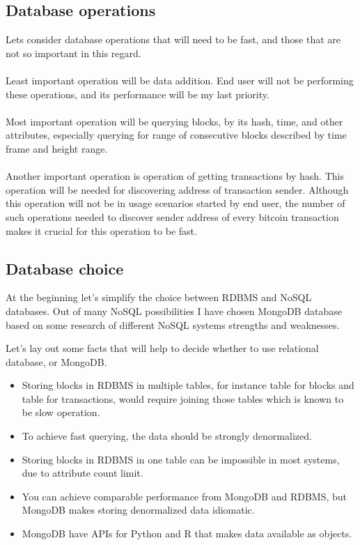 \documentclass[12pt, en, eng, oneside]{mgr}
\begin{document}
\subsection{Database operations}
Lets consider database operations that will need to be fast, and those that are not so important in this regard.
\\
\\
Least important operation will be data addition. End user will not be performing these operations, and its performance will be my last priority.
\\
\\
Most important operation will be querying blocks, by its hash, time, and other attributes, especially querying for range of consecutive blocks described by time frame and height range.
\\
\\
Another important operation is operation of getting transactions by hash. This operation will be needed for discovering address of transaction sender. Although this operation will not be in usage scenarios started by end user, the number of such operations needed to discover sender address of every bitcoin transaction makes it crucial for this operation to be fast.

\subsection{Database choice}
At the beginning let's simplify the choice between RDBMS and NoSQL databases. Out of many NoSQL possibilities I have chosen MongoDB database based on some research of different NoSQL systems strengths and weaknesses.

Let's lay out some facts that will help to decide whether to use relational database, or MongoDB.

\begin{itemize}
\item 
Storing blocks in RDBMS in multiple tables, for instance table for blocks and table for transactions, would require joining those tables which is known to be slow operation.
\item 
To achieve fast querying, the data should be strongly denormalized.
\item
Storing blocks in RDBMS in one table can be impossible in most systems, due to attribute count limit.
\item 
You can achieve comparable performance from MongoDB and RDBMS, but MongoDB makes storing denormalized data idiomatic.
\item
MongoDB have APIs for Python and R that makes data available as objects.
\end{itemize}
\end{document}
